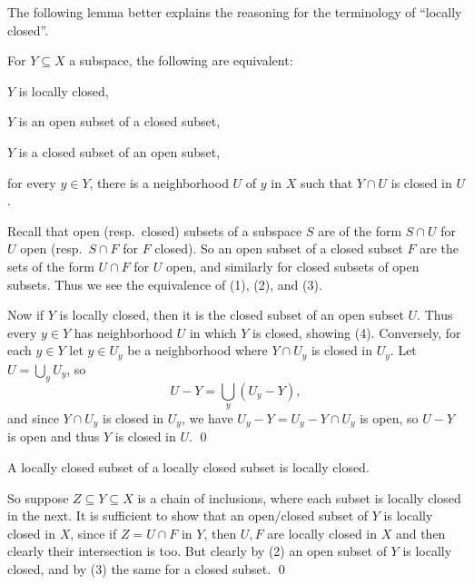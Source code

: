 \edefn

The following lemma better explains the reasoning for the terminology of ``locally closed''.

\blemm

    For $Y\subseteq X$ a subspace, the following are equivalent:
    \benum
        \item $Y$ is locally closed,
        \item $Y$ is an open subset of a closed subset,
        \item $Y$ is a closed subset of an open subset,
        \item for every $y\in Y$, there is a neighborhood $U$ of $y$ in $X$ such that $Y\cap U$ is closed in $U$.
    \eenum

\elemm

\bproof

    Recall that open (resp.\ closed) subsets of a subspace $S$ are of the form $S\cap U$ for $U$ open (resp.\ $S\cap F$ for $F$ closed).
    So an open subset of a closed subset $F$ are the sets of the form $U\cap F$ for $U$ open, and similarly for closed subsets of open subsets.
    Thus we see the equivalence of (1), (2), and (3).

    Now if $Y$ is locally closed, then it is the closed subset of an open subset $U$.
    Thus every $y\in Y$ has neighborhood $U$ in which $Y$ is closed, showing (4).
    Conversely, for each $y\in Y$ let $y\in U_y$ be a neighborhood where $Y\cap U_y$ is closed in $U_y$.
    Let $U=\bigcup_yU_y$, so
    $$ U - Y = \bigcup_y(U_y-Y) , $$
    and since $Y\cap U_y$ is closed in $U_y$, we have $U_y-Y=U_y-Y\cap U_y$ is open, so $U-Y$ is open and thus $Y$ is closed in $U$.
    \qed

\eproof

\bcoro

    A locally closed subset of a locally closed subset is locally closed.

\ecoro

\bproof

    So suppose $Z\subseteq Y\subseteq X$ is a chain of inclusions, where each subset is locally closed in the next.
    It is sufficient to show that an open/closed subset of $Y$ is locally closed in $X$, since if $Z=U\cap F$ in $Y$, then $U,F$ are locally closed in $X$ and then clearly
    their intersection is too.
    But clearly by (2) an open subset of $Y$ is locally closed, and by (3) the same for a closed subset.
    \qed

\eproof

